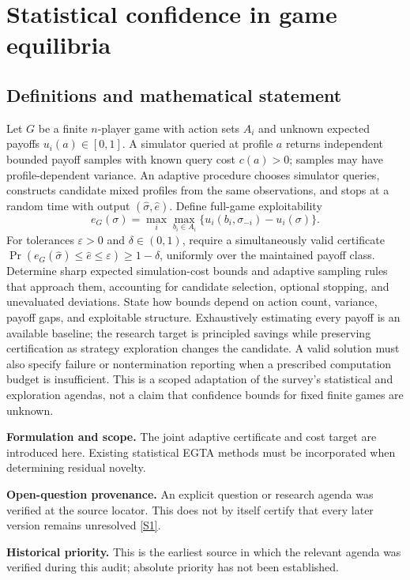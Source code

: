 \documentclass[11pt]{article}
\newcommand{\sref}[2]{\hyperlink{source:#1:#2}{[S#2]}}
\begin{document}
\section*{Statistical confidence in game equilibria}\label{30007570}
\subsection{Definitions and mathematical statement}
Let \(G\) be a finite \(n\)-player game with action sets \(A_i\) and unknown expected payoffs \(u_i(a)\in[0,1]\). A simulator queried at profile \(a\) returns independent bounded payoff samples with known query cost \(c(a)>0\); samples may have profile-dependent variance. An adaptive procedure chooses simulator queries, constructs candidate mixed profiles from the same observations, and stops at a random time with output \((\widehat\sigma,\widehat e)\). Define full-game exploitability
\[
 e_G(\sigma)=\max_i\max_{b_i\in A_i}
 \{u_i(b_i,\sigma_{-i})-u_i(\sigma)\}.
\]
For tolerances \(\varepsilon>0\) and \(\delta\in(0,1)\), require a simultaneously valid certificate \(\Pr(e_G(\widehat\sigma)\leq\widehat e\leq\varepsilon)\geq1-\delta\), uniformly over the maintained payoff class. Determine sharp expected simulation-cost bounds and adaptive sampling rules that approach them, accounting for candidate selection, optional stopping, and unevaluated deviations. State how bounds depend on action count, variance, payoff gaps, and exploitable structure. Exhaustively estimating every payoff is an available baseline; the research target is principled savings while preserving certification as strategy exploration changes the candidate. A valid solution must also specify failure or nontermination reporting when a prescribed computation budget is insufficient. This is a scoped adaptation of the survey’s statistical and exploration agendas, not a claim that confidence bounds for fixed finite games are unknown.

\par\textbf{Formulation and scope.} The joint adaptive certificate and cost target are introduced here. Existing statistical EGTA methods must be incorporated when determining residual novelty.

\par\textbf{Open-question provenance.} An explicit question or research agenda was verified at the source locator. This does not by itself certify that every later version remains unresolved \sref{30007570}{1}.

\par\textbf{Historical priority.} This is the earliest source in which the relevant agenda was verified during this audit; absolute priority has not been established.
\end{document}
